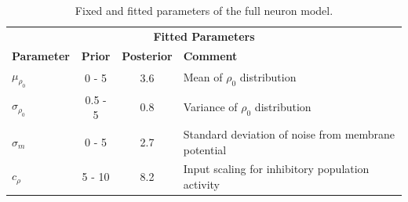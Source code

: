 \begin{table} [!th]
\begin{center}
            \begin{tabular}{l|c|c|p{6.1cm}}
                \multicolumn{4}{c}{\rule{0pt}{4ex}\textbf{Fitted Parameters}}\\
                \textbf{Parameter} & \textbf{Prior} & \textbf{Posterior} & \textbf{Comment} \\
				\hline
				$\mu_{\rho_0}$ & 0 - 5 & 3.6 & Mean of $\rho_0$ distribution\\
                $\sigma_{\rho_0}$ & 0.5 - 5 & 0.8 & Variance of $\rho_0$ distribution\\
                $\sigma_{m}$ & 0 - 5 & 2.7 & Standard deviation of noise from membrane potential\\
                $c_{\rho}$ & 5 - 10 & 8.2 & Input scaling for inhibitory population activity\\
			\end{tabular}
		\end{center}
		\caption{Fixed and fitted parameters of the full neuron model.}
		\label{tab:neuroparams}
	\end{table}

